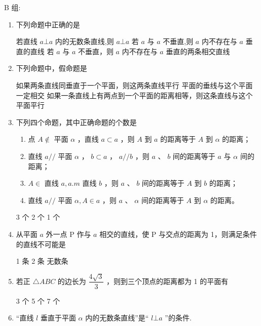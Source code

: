 B 组:
\begin{enumerate}

\item 下列命题中正确的是 

{若直线 $a \bot  a$ 内的无数条直线,则 $a \bot  a$}
{若 $a$ 与 $a$ 不垂直,则 $a$ 内不存在与 $a$ 垂直的直线}
{若 $a$ 与 $a$ 不垂直，则 $a$ 内不存在与 $a$ 垂直的两条相交直线}

\item 下列命题中，假命题是 

{如果两条直线同垂直于一个平面，则这两条直线平行}
{平面的垂线与这个平面一定相交}
{如果一条直线上有两点到一个平面的距离相等，则这条直线与这个平面平行}

\item 下列四个命题，其中正确命题的个数是 
\begin{enumerate}
    \item 点 $A \notin$ 平面 $\alpha$ ，直线 $a \subset  a$ ，则 $A$ 到 $a$ 的距离等于 $A$ 到 $\alpha$ 的距离；
    
    \item 直线 $a//$ 平面 $\alpha$ ， $b \subset  a$ ， $a// b$ ，则 $a$ 、 $b$ 间的距离等于 $a$ 与 $\alpha$ 间的距离；
    
    \item $A \in$ 直线 $a,a.m$ 直线 $b$ ，则 $a\text{ 、 }b$ 间的距离等于 $A$ 到 $b$ 的距离；
        
    \item 直线 $a//$ 平面 $\alpha ,A \in  a$ ，则 $a\text{ 、 }\alpha$ 间的距离等于 $A$ 到 $\alpha$ 的距离。
\end{enumerate}

 {3 个} {2 个} {1 个}

\item 从平面 $a$ 外一点 P 作与 $a$ 相交的直线，使 P 与交点的距离为 1，则满足条件的直线不可能是

 {1 条} {2 条} {无数条}

\item 若正 $\bigtriangleup {ABC}$ 的边长为 $\dfrac{4\sqrt{3}}{3}$ ，则到三个顶点的距离都为 1 的平面有 

 {3 个} {5 个} {7 个}

\item “直线 $l$ 垂直于平面 $\alpha$ 内的无数条直线”是“ $l\bot a$ ”的条件.


\end{enumerate}
